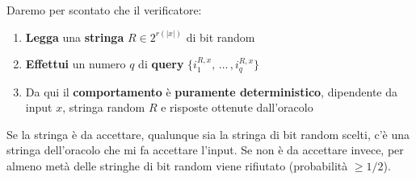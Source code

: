 Daremo per scontato che il verificatore: 
\begin{enumerate}
	\item \textbf{Legga} una \textbf{stringa} $R \in 2^{r(|x|)}$ di bit random
	\item \textbf{Effettui} un numero $q$ di \textbf{query} $\{i_1^{R,x}, \, \dots \, , i_q^{R,x}\}$
	\item Da qui il \textbf{comportamento} è \textbf{puramente deterministico}, dipendente da input $x$, stringa random $R$ e risposte ottenute dall'oracolo
\end{enumerate}

Se la stringa è da accettare, qualunque sia la stringa di bit random scelti, c'è una stringa dell'oracolo che mi fa accettare l'input. Se non è da accettare invece, per almeno metà delle stringhe di bit random viene rifiutato (probabilità $\geq 1/2$).\\

